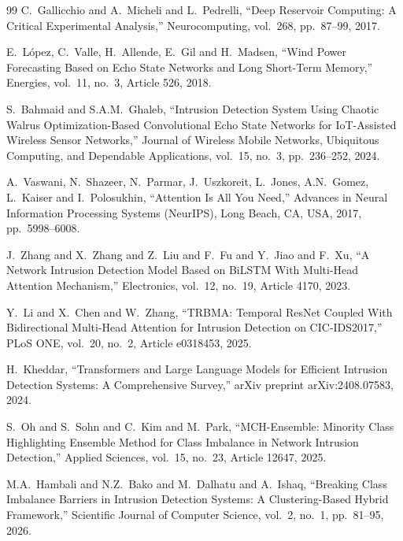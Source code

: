 \documentclass[5p,times]{elsarticle}
\begin{document}
\begin{thebibliography}{99}
		C.\ Gallicchio and A.\ Micheli and L.\ Pedrelli,
		``Deep Reservoir Computing: A Critical Experimental Analysis,''
		Neurocomputing,
		vol.\ 268,
		pp.\ 87--99,
		2017.
		
		E.\ L\'{o}pez, C.\ Valle, H.\ Allende, E.\ Gil and H.\ Madsen,
		``Wind Power Forecasting Based on Echo State Networks and Long Short-Term Memory,''
		Energies,
		vol.\ 11,
		no.\ 3,
		Article 526,
		2018.
		
		S.\ Bahmaid and S.A.M.\ Ghaleb,
		``Intrusion Detection System Using Chaotic Walrus Optimization-Based Convolutional Echo State Networks for IoT-Assisted Wireless Sensor Networks,''
		Journal of Wireless Mobile Networks, Ubiquitous Computing, and Dependable Applications,
		vol.\ 15,
		no.\ 3,
		pp.\ 236--252,
		2024.
		
		A.\ Vaswani, N.\ Shazeer, N.\ Parmar, J.\ Uszkoreit, L.\ Jones, A.N.\ Gomez, L.\ Kaiser and I.\ Polosukhin,
		``Attention Is All You Need,''
		Advances in Neural Information Processing Systems (NeurIPS),
		Long Beach, CA, USA,
		2017,
		pp.\ 5998--6008.
		
		J.\ Zhang and X.\ Zhang and Z.\ Liu and F.\ Fu and Y.\ Jiao and F.\ Xu,
		``A Network Intrusion Detection Model Based on BiLSTM With Multi-Head Attention Mechanism,''
		Electronics,
		vol.\ 12,
		no.\ 19,
		Article 4170,
		2023.
		
		Y.\ Li and X.\ Chen and W.\ Zhang,
		``TRBMA: Temporal ResNet Coupled With Bidirectional Multi-Head Attention for Intrusion Detection on CIC-IDS2017,''
		PLoS ONE,
		vol.\ 20,
		no.\ 2,
		Article e0318453,
		2025.
		
		H.\ Kheddar,
		``Transformers and Large Language Models for Efficient Intrusion Detection Systems: A Comprehensive Survey,''
		arXiv preprint arXiv:2408.07583,
		2024.
		
		S.\ Oh and S.\ Sohn and C.\ Kim and M.\ Park,
		``MCH-Ensemble: Minority Class Highlighting Ensemble Method for Class Imbalance in Network Intrusion Detection,''
		Applied Sciences,
		vol.\ 15,
		no.\ 23,
		Article 12647,
		2025.
		
		M.A.\ Hambali and N.Z.\ Bako and M.\ Dalhatu and A.\ Ishaq,
		``Breaking Class Imbalance Barriers in Intrusion Detection Systems: A Clustering-Based Hybrid Framework,''
		Scientific Journal of Computer Science,
		vol.\ 2,
		no.\ 1,
		pp.\ 81--95,
		2026.
		

\end{thebibliography}
\end{document}
